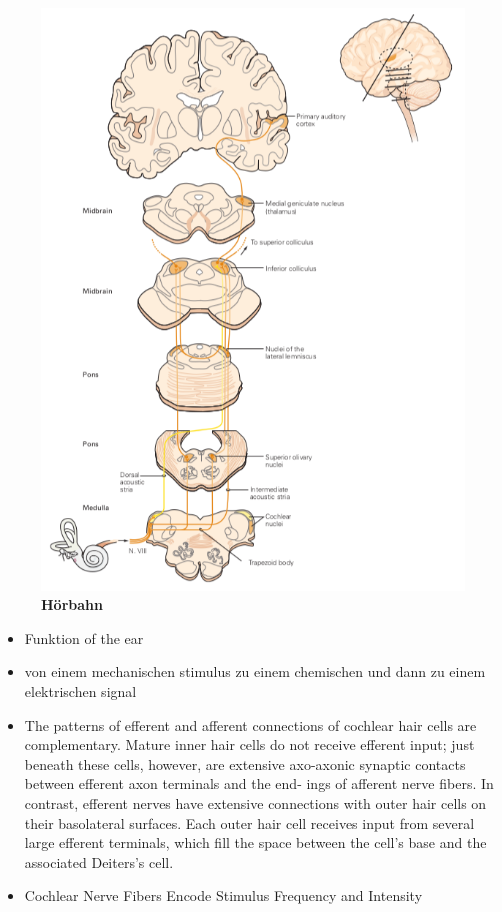 \documentclass[12pt,a4paper,pdftex]{article}
\begin{document}
\begin{figure}
    \centering
    \includegraphics{pictures/auditory/hoerbahn_pathway.png}
    \caption[Hörbahn]{\textbf{Hörbahn}}
    \label{fig:hoerbahn_pathway}
\end{figure}


\begin{itemize}
 \item Funktion of the ear
    \item von einem mechanischen stimulus zu einem chemischen und dann zu einem elektrischen signal
    \item The patterns of efferent and afferent connections
    of cochlear hair cells are complementary. Mature inner
    hair cells do not receive efferent input; just beneath
    these cells, however, are extensive axo-axonic synaptic
    contacts between efferent axon terminals and the end-
    ings of afferent nerve fibers. In contrast, efferent nerves
    have extensive connections with outer hair cells on their
    basolateral surfaces. Each outer hair cell receives input
    from several large efferent terminals, which fill the space
    between the cell’s base and the associated Deiters’s cell.
    \item Cochlear Nerve Fibers Encode Stimulus Frequency
    and Intensity
    \end{itemize}
\end{document}
